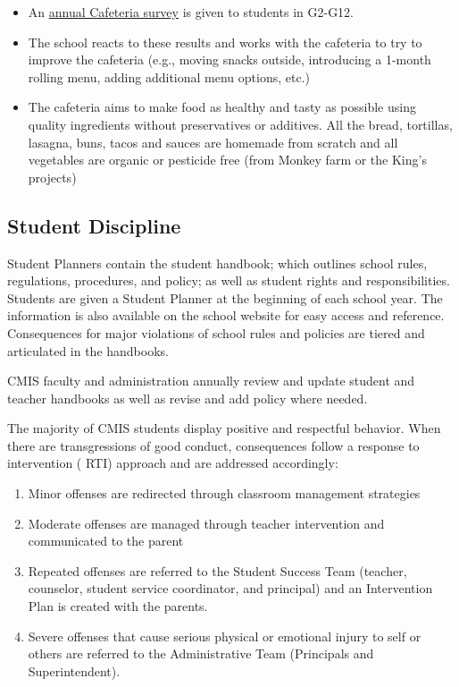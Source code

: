 \begin{itemize}
\item An \href{https://docs.google.com/spreadsheets/d/1Z2Wcw-UM1njZZ51OefDeCqH8mDTJvaefXS_WJbK4Z20/edit#gid=1328983646}{annual Cafeteria survey} is given to students in G2-G12. 
\item The school reacts to these results and works with the cafeteria to try to improve the cafeteria (e.g., moving snacks outside, introducing a 1-month rolling menu, adding additional menu options, etc.)
\item The cafeteria aims to make food as healthy and tasty as possible using quality ingredients without preservatives or additives. All the bread, tortillas, lasagna, buns, tacos and sauces are homemade from scratch and all vegetables are organic or pesticide free (from Monkey farm or the King’s projects)
\end{itemize}

\subsection{Student Discipline}
Student Planners contain the student handbook; which outlines school rules, regulations, procedures, and policy; as well as student rights and responsibilities.  Students are given a Student Planner at the beginning of each school year.  The information is also available on the school website for easy access and reference.  Consequences for major violations of school rules and policies are tiered and articulated in the handbooks. 

CMIS faculty and administration annually review and update student and teacher handbooks as well as revise and add policy where needed. 

The majority of CMIS students display positive and respectful behavior. When there are transgressions of good conduct, consequences follow a response to intervention ( RTI) approach and are addressed accordingly:

\begin{enumerate}
\item Minor offenses are redirected through classroom management strategies 
\item Moderate offenses are managed through teacher intervention and communicated to the parent
\item Repeated offenses are referred to the Student Success Team (teacher, counselor, student service coordinator, and principal) and an Intervention Plan is created with the parents. 
\item Severe offenses that cause serious physical or emotional injury to self or others are referred to the Administrative Team (Principals and Superintendent). 
\end{enumerate}

